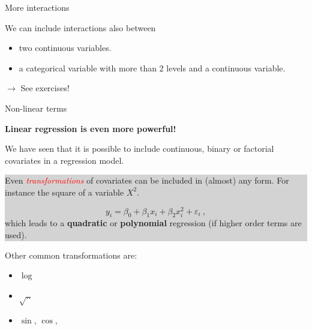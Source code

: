 \documentclass[10pt,ignorenonframetext,]{beamer}
\providecommand{\tightlist}{%
  \setlength{\itemsep}{0pt}\setlength{\parskip}{0pt}}
\begin{document}
\begin{frame}

\begin{block}{More interactions}

\vspace{4mm}

We can include interactions also between

\begin{itemize}
\tightlist
\item
  two continuous variables.
\item
  a categorical variable with more than 2 levels and a continuous
  variable.
\end{itemize}

\vspace{4mm}

\(\rightarrow\) See exercises!

\vspace{4mm}

\end{block}

\end{frame}

\begin{frame}

\begin{block}{Non-linear terms}

\vspace{2mm}

\textbf{Linear regression is even more powerful!} \vspace{2mm}

We have seen that it is possible to include continuous, binary or
factorial covariates in a regression model.

\vspace{2mm}

\colorbox{lightgray}{\begin{minipage}{10cm}
Even \emph{\textcolor{red}{transformations}} of covariates can be included in (almost) any form. For instance the square of a variable $X^2$.

\begin{equation*}
y_i = \beta_0 + \beta_1 x_i + \beta_2 x_i^2 + \varepsilon_i \ , 
\end{equation*}
which leads to a {\bf quadratic} or {\bf polynomial} regression (if higher order terms are used).
\end{minipage}}

\vspace{4mm}

Other common transformations are:

\begin{itemize}
\tightlist
\item
  \(\log\)
\item
  \(\sqrt{..}\)
\item
  \(\sin\), \(\cos\),
\end{itemize}

\end{block}

\end{frame}
\end{document}
